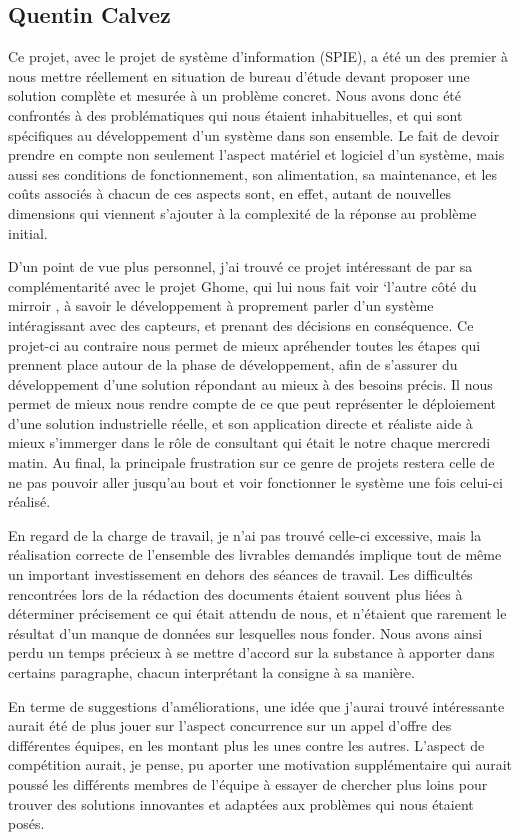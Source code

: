 \subsection{Quentin Calvez}
Ce projet, avec le projet de système d'information (SPIE), a été un des premier à nous mettre réellement en situation de bureau d'étude devant proposer une solution complète et mesurée à un problème concret. Nous avons donc été confrontés à des problématiques qui nous étaient inhabituelles, et qui sont spécifiques au développement d'un système dans son ensemble. Le fait de devoir prendre en compte non seulement l'aspect matériel et logiciel d'un système, mais aussi ses conditions de fonctionnement, son alimentation, sa maintenance, et les coûts associés à chacun de ces aspects sont, en effet, autant de nouvelles dimensions qui viennent s'ajouter à la complexité de la réponse au problème initial.

D'un point de vue plus personnel, j'ai trouvé ce projet intéressant de par sa complémentarité avec le projet Ghome, qui lui nous fait voir `\og l'autre côté du mirroir \fg, à savoir le développement à proprement parler d'un système intéragissant avec des capteurs, et prenant des décisions en conséquence. Ce projet-ci au contraire nous permet de mieux apréhender toutes les étapes qui prennent place autour de la phase de développement, afin de s'assurer du développement d'une solution répondant au mieux à des besoins précis. Il nous permet de mieux nous rendre compte de ce que peut représenter le déploiement d'une solution industrielle réelle, et son application directe et réaliste aide à mieux s'immerger dans le rôle de consultant qui était le notre chaque mercredi matin. Au final, la principale frustration sur ce genre de projets restera celle de ne pas pouvoir aller jusqu'au bout et voir fonctionner le système une fois celui-ci réalisé.

En regard de la charge de travail, je n'ai pas trouvé celle-ci excessive, mais la réalisation correcte de l'ensemble des livrables demandés implique tout de même un important investissement en dehors des séances de travail. Les difficultés rencontrées lors de la rédaction des documents étaient souvent plus liées à déterminer précisement ce qui était attendu de nous, et n'étaient que rarement le résultat d'un manque de données sur lesquelles nous fonder. Nous avons ainsi perdu un temps précieux à se mettre d'accord sur la substance à apporter dans certains paragraphe, chacun interprétant la consigne à sa manière.

En terme de suggestions d'améliorations, une idée que j'aurai trouvé intéressante aurait été de plus jouer sur l'aspect \og concurrence sur un appel d'offre \fg des différentes équipes, en les montant plus les unes contre les autres. L'aspect de compétition aurait, je pense, pu aporter une motivation supplémentaire qui aurait poussé les différents membres de l'équipe à essayer de chercher plus loins pour trouver des solutions innovantes et adaptées aux problèmes qui nous étaient posés.

